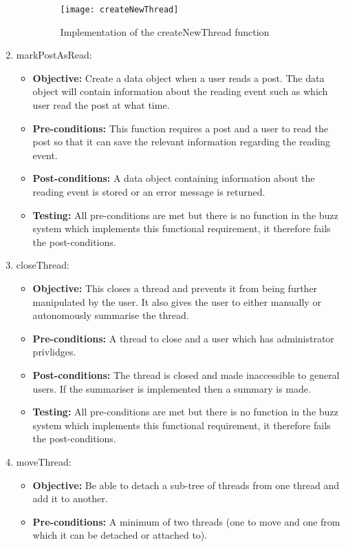 \begin{enumerate}
\begin{itemize}
\begin{figure}[h!]
  \centering
    \texttt{[image: createNewThread]}
    \caption{Implementation of the createNewThread function}
\end{figure}
	\end{itemize}
\item markPostAsRead:
	\begin{itemize}
		\item\textbf{Objective: } Create a data object when a user reads a post. The data object will contain information about the reading event such as which user read the post at what time.
		\item\textbf{Pre-conditions: } This function requires a post and a user to read the post so that it can save the relevant information regarding the reading event.
		\item\textbf{Post-conditions: } A data object containing information about the reading event is stored or an error message is returned.
		\item\textbf{Testing: } All pre-conditions are met but there is no function in the buzz system which implements this functional requirement, it therefore fails the post-conditions.
	\end{itemize}
\item closeThread:
	\begin{itemize}
		\item\textbf{Objective: }This closes a thread and prevents it from being further manipulated by the user. It also gives the user to either manually or autonomously summarise the thread.
		\item\textbf{Pre-conditions: } A thread to close and a user which has administrator privlidges.
		\item\textbf{Post-conditions: } The thread is closed and made inaccessible  to general users. If the summariser is implemented then a summary is made.
		\item\textbf{Testing: } All pre-conditions are met but there is no function in the buzz system which implements this functional requirement, it therefore fails the post-conditions.
	\end{itemize}
\item moveThread:
	\begin{itemize}
		\item\textbf{Objective: }  Be able to detach a sub-tree of threads from one thread and add it to another.
		\item\textbf{Pre-conditions: } A minimum of two threads (one to move and one from which it can be detached or attached to).

\end{itemize}
\end{enumerate}

